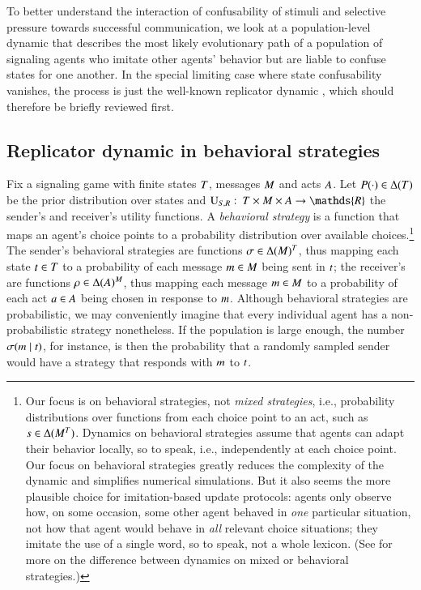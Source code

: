 \documentclass[fleqn,reqno,10pt]{article}
\renewcommand{\Pr}{\ensuremath{P}}
\begin{document}
To better understand the interaction of confusability of stimuli and selective pressure towards
successful communication, we look at a population-level dynamic that describes the most likely
evolutionary path of a population of signaling agents who imitate other agents' behavior but
are liable to confuse states for one another. In the special limiting case where state
confusability vanishes, the process is just the well-known replicator dynamic
\citep{TaylorJonker1978:Evolutionary-St}, which should therefore be briefly reviewed first.



\subsection{Replicator dynamic in behavioral strategies}
\label{sec:repl-dynam-behav}

Fix a signaling game with finite states $T$, messages $M$ and acts $A$. Let
$\Pr(\cdot) \in \Delta(\States)$ be the prior distribution over states and
$\Util_{\sen,\rec} \mycolon \States \times \Messgs \times \Acts \rightarrow \mathds{R}$ the
sender's and receiver's utility functions. A \emph{behavioral strategy} is a function that maps
an agent's choice points to a probability distribution over available choices.\footnote{Our
  focus is on behavioral strategies, not \emph{mixed strategies}, i.e., probability
  distributions over functions from each choice point to an act, such as
  $s \in \Delta(M^{T})$.  Dynamics on behavioral strategies assume that agents can
  adapt their behavior locally, so to speak, i.e., independently at each choice point. Our
  focus on behavioral strategies greatly reduces the complexity of the dynamic and simplifies
  numerical simulations. But it also seems the more plausible choice for imitation-based update
  protocols: agents only observe how, on some occasion, some other agent behaved in \emph{one}
  particular situation, not how that agent would behave in \emph{all} relevant choice
  situations; they imitate the use of a single word, so to speak, not a whole lexicon. (See
  \citet{Cressman2003:Evolutionary-Dy} for more on the difference between dynamics on mixed or
  behavioral strategies.)} The sender's behavioral strategies are functions
$\sigma \in \Delta(M)^T$, thus mapping each state $t \in T$ to a
probability of each message $m \in M$ being sent in $t$; the receiver's are
functions $\rho \in \Delta(A)^M$, thus mapping each message $m \in M$
to a probability of each act $a \in A$ being chosen in response to $m$. Although
behavioral strategies are probabilistic, we may conveniently imagine that every individual
agent has a non-probabilistic strategy nonetheless. If the population is large enough, the
number $\sigma(m \mid t)$, for instance, is then the probability that a randomly
sampled sender would have a strategy that responds with $m$ to $t$.
\end{document}

